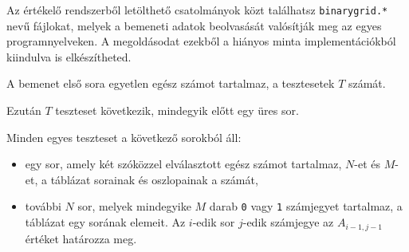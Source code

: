 

\begin{warning}
Az értékelő rendszerből letölthető csatolmányok közt találhatsz \texttt{binarygrid.*} nevű fájlokat, melyek a bemeneti adatok beolvasását valósítják meg az egyes programnyelveken. A megoldásodat ezekből a hiányos minta implementációkból kiindulva is elkészítheted.
\end{warning}

\InputFile
A bemenet első sora egyetlen egész számot tartalmaz, a tesztesetek $T$ számát.

Ezután $T$ teszteset következik, mindegyik előtt egy üres sor.

Minden egyes teszteset a következő sorokból áll:
\begin{itemize}
\item egy sor, amely két szóközzel elválasztott egész számot tartalmaz, $N$-et és $M$-et, a táblázat sorainak és oszlopainak a számát,
\item további $N$ sor, melyek mindegyike $M$ darab \texttt{0} vagy \texttt{1} számjegyet tartalmaz, a táblázat egy sorának elemeit. Az $i$-edik sor $j$-edik számjegye az $A_{i-1,j-1}$ értéket határozza meg.
\end{itemize}




